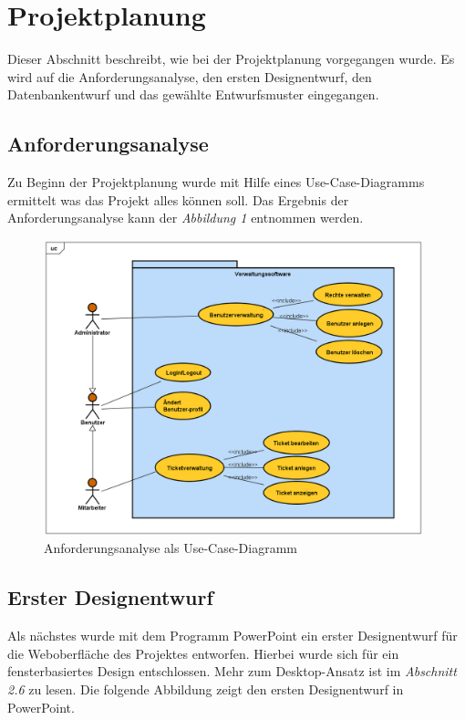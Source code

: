 \documentclass[12pt, a4paper]{article}
\begin{document}
\section{Projektplanung}
Dieser Abschnitt beschreibt, wie bei der Projektplanung vorgegangen wurde. Es wird auf die  Anforderungsanalyse, den ersten Designentwurf, den Datenbankentwurf und das gewählte Entwurfsmuster eingegangen.

\subsection{Anforderungsanalyse}
Zu Beginn der Projektplanung wurde mit Hilfe eines Use-Case-Diagramms ermittelt was das Projekt alles können soll. Das Ergebnis der Anforderungsanalyse kann der \textit{Abbildung 1} entnommen werden.

\begin{figure}[H]
	\begin{center}
	\includegraphics[width=110mm]{Bilder/UseCaseAnforderungsanalyse.png}
	\end{center}
	\caption{Anforderungsanalyse als Use-Case-Diagramm}
\end{figure}

\subsection{Erster Designentwurf}

Als nächstes wurde mit dem Programm PowerPoint ein erster Designentwurf für die Weboberfläche des Projektes entworfen. Hierbei wurde sich für ein fensterbasiertes Design entschlossen. Mehr zum Desktop-Ansatz ist im \textit{Abschnitt 2.6} zu lesen. Die folgende Abbildung zeigt den ersten Designentwurf in PowerPoint.
\end{document}
